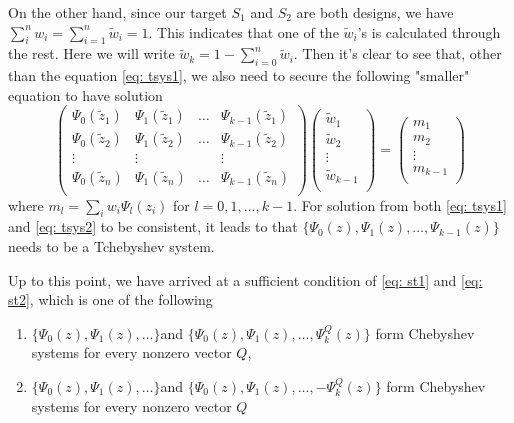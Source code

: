 \documentclass[11pt]{amsart}
\theoremstyle{definition}
\theoremstyle{remark}
\begin{document}
On the other hand, since our target $S_1$ and $S_2$ are both designs, we have $\sum_i^nw_i = \sum_{i=1}^n\tilde{w}_i=1$. This indicates that one of the $\tilde{w}_i$'s is calculated through the rest. Here we will write $\tilde{w}_k = 1-\sum_{i=0}^n \tilde{w}_i$. Then it's clear to see that, other than the equation \eqref{eq: tsys1}, we also need to secure the following "smaller" equation to have solution
\begin{equation}\label{eq: tsys2}
\left ( \begin{array}{cccc}

\Psi_{0}(\tilde{z}_1) &\Psi_{1}(\tilde{z}_1)&\ldots &\Psi_{k-1}(\tilde{z}_1)\\
\Psi_{0}(\tilde{z}_2) &\Psi_{1}(\tilde{z}_2)&\ldots &\Psi_{k-1}(\tilde{z}_2)\\
\vdots & \vdots &&\vdots\\
\Psi_{0}(\tilde{z}_n) &\Psi_{1}(\tilde{z}_n)&\ldots &\Psi_{k-1}(\tilde{z}_n)\\
\end{array}\right) \left(\begin{array}{c}
  \tilde{w}_1    \\
   \tilde{w}_2    \\
   \vdots\\
    \tilde{w}_{k-1}    \\
      
\end{array}\right) = \left(\begin{array}{c}
  m_1    \\
   m_2    \\
   \vdots\\
    m_{k-1}   \\
      
\end{array}\right) 
\end{equation} where $m_l = \sum_{i}w_i\Psi_l(z_i)$ for $l=0,1,\ldots,k-1$. For solution from both \eqref{eq: tsys1} and \eqref{eq: tsys2} to be consistent, it leads to that $\{\Psi_0(z),\Psi_1(z),\ldots, \Psi_{k-1}(z)\}$ needs to be a Tchebyshev system.

Up to this point, we have arrived at a sufficient condition of  \eqref{eq: st1} and \eqref{eq: st2}, which is one of the following  \begin{enumerate}
    \item\label{3.5}$\{\Psi_0(z),\Psi_1(z),\ldots\} $and  $\{\Psi_0(z),\Psi_1(z),\ldots, \Psi_k^Q(z)\}$ form Chebyshev systems for every nonzero vector $Q$, 
     \item\label{3.6} $\{\Psi_0(z),\Psi_1(z),\ldots\} $and  $\{\Psi_0(z),\Psi_1(z),\ldots, -\Psi_k^Q(z)\}$ form Chebyshev systems for every nonzero vector $Q$
\end{enumerate} 
\end{document}
